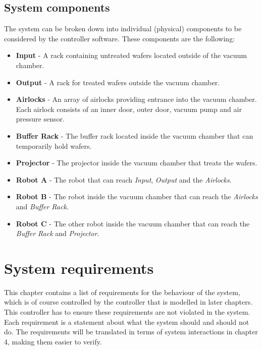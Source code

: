 \documentclass[12pt]{report}
\newcounter{counter}
\begin{document}
	\section{System components}
	The system can be broken down into individual (physical) components to be considered by the controller software. These components are the following:
	\begin{itemize}
	\item \textbf{Input} - A rack containing untreated wafers located outside of the vacuum chamber.
	\item \textbf{Output} - A rack for treated wafers outside the vacuum chamber.
	\item \textbf{Airlocks} - An array of airlocks providing entrance into the vacuum chamber. Each airlock consists of an inner door, outer door, vacuum pump and air pressure sensor.
	\item \textbf{Buffer Rack} - The buffer rack located inside the vacuum chamber that can temporarily hold wafers.
	\item \textbf{Projector} - The projector inside the vacuum chamber that treats the wafers.
	\item \textbf{Robot A} - The robot that can reach \emph{Input}, \emph{Output} and the \emph{Airlocks}.
	\item \textbf{Robot B} - The robot inside the vacuum chamber that can reach the \emph{Airlocks} and \emph{Buffer Rack}.
	\item \textbf{Robot C} - The other robot inside the vacuum chamber that can reach the \emph{Buffer Rack} and \emph{Projector}.
	\end{itemize}
	
	\chapter{System requirements}
	
	\newcommand{\req}[1]{
		\item[\textbf{R\stepcounter{counter}\arabic{counter}}] {#1}
		\hrule
	}
	
	\newcommand{\reqb}[2]{
		\item[\textbf{{#1}}] {#2}
		\hrule
	}
	
	This chapter contains a list of requirements for the behaviour of the system, which is of course controlled by the controller that is modelled in later chapters. This controller has to ensure these requirements are not violated in the system. Each requirement is a statement about what the system should and should not do. The requirements will be translated in terms of system interactions in chapter 4, making them easier to verify.
\end{document}
